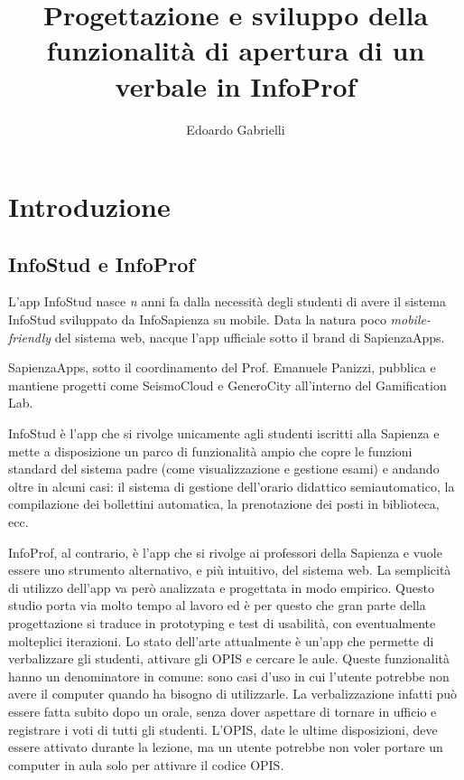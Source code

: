 \documentclass[Lau, oneside]{sapthesis}%
\title{Progettazione e sviluppo della funzionalità di apertura di un verbale in InfoProf}
\author{Edoardo Gabrielli}
\begin{document}
\frontmatter
\maketitle

\tableofcontents

\mainmatter
\chapter{Introduzione}
\label{ch:1}

\section{InfoStud e InfoProf}
\label{sec:pres}
L'app InfoStud nasce \textit{n} anni fa dalla necessità degli studenti di avere il sistema InfoStud sviluppato da InfoSapienza su mobile.
Data la natura poco \textit{mobile-friendly} del sistema web, nacque l'app ufficiale sotto il brand di SapienzaApps.

SapienzaApps, sotto il coordinamento del Prof. Emanuele Panizzi, pubblica e mantiene progetti come SeismoCloud e GeneroCity all'interno
del Gamification Lab.

InfoStud è l'app che si rivolge unicamente agli studenti iscritti alla Sapienza e mette a disposizione un parco di funzionalità ampio
che copre le funzioni standard del sistema padre (come visualizzazione e gestione esami) e andando oltre in alcuni casi: il sistema
di gestione dell'orario didattico semiautomatico, la compilazione dei bollettini automatica, la prenotazione dei posti in biblioteca, ecc.

InfoProf, al contrario, è l'app che si rivolge ai professori della Sapienza e vuole essere uno strumento alternativo, e più intuitivo, 
del sistema web. La semplicità di utilizzo dell'app va però analizzata e progettata in modo empirico. Questo studio porta via molto tempo 
al lavoro ed è per questo che gran parte della progettazione si traduce in prototyping e test di usabilità, con eventualmente molteplici
iterazioni. Lo stato dell'arte attualmente è un'app che permette di verbalizzare gli studenti, attivare gli OPIS e cercare le aule.
Queste funzionalità hanno un denominatore in comune: sono casi d'uso in cui l'utente potrebbe non avere il computer quando ha bisogno
di utilizzarle. La verbalizzazione infatti può essere fatta subito dopo un orale, senza dover aspettare di tornare in ufficio e 
registrare i voti di tutti gli studenti. L'OPIS, date le ultime disposizioni, deve essere attivato durante la lezione, ma un utente
potrebbe non voler portare un computer in aula solo per attivare il codice OPIS.
\end{document}

